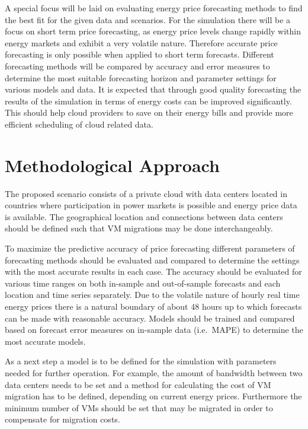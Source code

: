 \documentclass[a4paper]{article}
\begin{document}
A special focus will be laid on evaluating energy price forecasting methods to find the best fit for the given data and scenarios. For the simulation there will be a focus on short term price forecasting, as energy price levels change rapidly within energy markets and exhibit a very volatile nature. Therefore accurate price forecasting is only possible when applied to short term forecasts. 
Different forecasting methods will be compared by accuracy and error measures to determine the most suitable forecasting horizon and parameter settings for various models and data. It is expected that through good quality forecasting the results of the simulation in terms of energy costs can be improved significantly. This should help cloud providers to save on their energy bills and provide more efficient scheduling of cloud related data. 


\section{Methodological Approach}

The proposed scenario consists of a private cloud with data centers located in countries where participation in power markets is possible and energy price data is available. The geographical location and connections between data centers should be defined such that VM migrations may be done interchangeably. 

To maximize the predictive accuracy of price forecasting different parameters of forecasting methods should be evaluated and compared to determine the settings with the most accurate results in each case. The accuracy should be evaluated for various time ranges on both in-sample and out-of-sample forecasts and each location and time series separately. Due to the volatile nature of hourly real time energy prices there is a natural boundary of about 48 hours up to which forecasts can be made with reasonable accuracy. Models should be trained and compared based on forecast error measures on in-sample data (i.e.~MAPE) to determine the most accurate models. 

As a next step a model is to be defined for the simulation with parameters needed for further operation. For example, the amount of bandwidth between two data centers needs to be set and a method for calculating the cost of VM migration has to be defined, depending on current energy prices. Furthermore the minimum number of VMs should be set that may be migrated in order to compensate for migration costs. 
\end{document}
